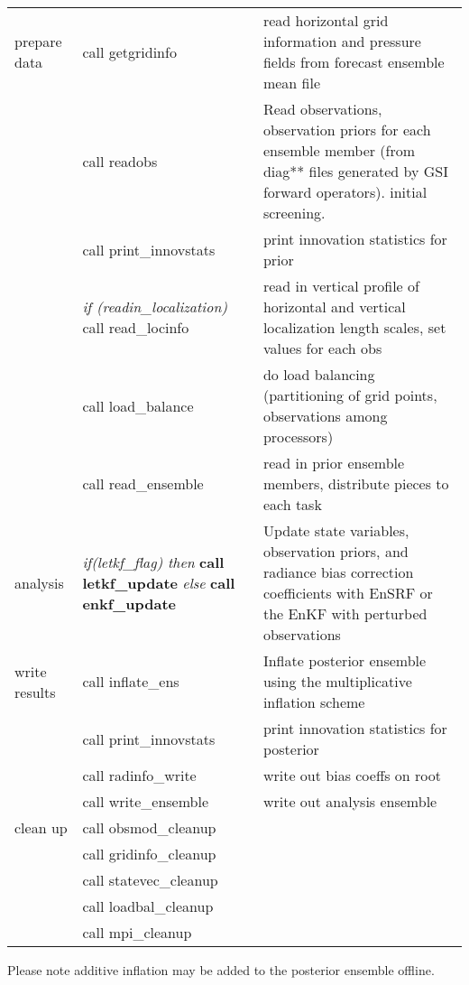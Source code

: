 \begin{footnotesize}
\begin{center}
\begin{tabular}{| m{2cm} | p{4cm} | p{8cm} |}
prepare data & call getgridinfo & read horizontal grid information and pressure fields from forecast ensemble mean file\\ \cline{2-3}
&call readobs & Read observations, observation priors for each ensemble member (from diag** files generated by GSI forward operators).
 initial screening. \\ \cline{2-3}
&call print\_innovstats & print innovation statistics for prior \\ \cline{2-3}
& \textit{if (readin\_localization)} \newline
call read\_locinfo  & read in vertical profile of horizontal and vertical localization length scales, set values for each obs \\ \cline{2-3}
&call load\_balance &do load balancing (partitioning of grid points, observations among processors)\\ \cline{2-3}
&call read\_ensemble &read in prior ensemble members, distribute pieces to each task\\
\hline
analysis&
 \textit{if(letkf\_flag) then} \newline
    \textbf{ call letkf\_update} \newline
 \textit{else} \newline
    \textbf{call enkf\_update}
& Update state variables, observation priors, and radiance bias correction coefficients with EnSRF or the EnKF with perturbed observations\\
\hline
write results &  call inflate\_ens & Inflate posterior ensemble using the multiplicative inflation scheme\\ \cline{2-3}
&call print\_innovstats&print innovation statistics for posterior\\ \cline{2-3}
&call radinfo\_write&write out bias coeffs on root\\ \cline{2-3}
&call write\_ensemble&  write out analysis ensemble \\ \cline{2-3}
\hline
clean up &call obsmod\_cleanup & \\
&call gridinfo\_cleanup&\\
&call statevec\_cleanup&\\
&call loadbal\_cleanup&\\
&call mpi\_cleanup&\\
\hline
\end{tabular}
\end{center}
\end{footnotesize}

Please note additive inflation may be added to the posterior ensemble offline.

